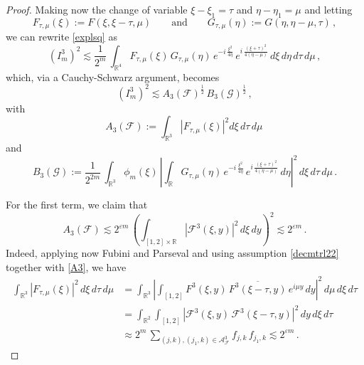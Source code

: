 \documentclass[a4paper,reqno]{amsart}
\numberwithin{equation}{section}
\theoremstyle{definition}
\newcommand{\R}{\mathbb{R}}
\def\F{\mathcal{F}}
\def\G{\mathcal{G}}
\def\v{\varepsilon}
\def\A{\mathcal{A}}
\begin{document}
\begin{proof}
Making now the change of variable $\xi-\xi_1=\tau$ and $\eta-\eta_1=\mu$ and letting
\begin{equation}\label{FG}
	F_{\tau,\mu}(\xi):=F(\xi,\xi-\tau,\mu)\qquad\textrm{and}\qquad G_{\tau,\mu}(\eta):=G(\eta,\eta-\mu,\tau)\,,
\end{equation}
we can rewrite \eqref{explsq} as
\begin{equation}\label{explsq1}
	(I_m^3)^2\lesssim
	\frac{1}{2^m}\,\int_{\R^4} F_{\tau,\mu}(\xi)\,G_{\tau,\mu}(\eta)\,
	e^{-i\,\frac{\xi^2}{4 \eta}}\,e^{i\,\frac{(\xi+\tau)^2}{4(\eta-\mu)}}\,d\xi\,d\eta\,d\tau\,d\mu\,,
\end{equation}
which, via a Cauchy-Schwarz argument, becomes
\begin{equation}\label{IM3}
	(I_m^3)^2\lesssim A_3(\F)^{\frac{1}{2}}\,B_3(\G)^{\frac{1}{2}}\,,
\end{equation}
with
\begin{equation}\label{reduct3a}
A_3(\F):=\int_{\R^3} \left| F_{\tau,\mu}(\xi)\right|^2 d\xi\,d\tau\,d\mu\,
\end{equation}
and
\begin{equation}\label{reduct3b}
B_3(\G):=\frac{1}{2^{2m}}\,\int_{\R^3}\phi_m(\xi)\,\left|\int_{\R} G_{\tau,\mu}(\eta)\,
	e^{-i\,\frac{\xi^2}{4 \eta}}\,e^{i\,\frac{(\xi+\tau)^2}{4(\eta-\mu)}}\,d\eta\right|^2\,d\xi\,d\tau\,d\mu\,.
\end{equation}


For the first term, we claim that
\begin{equation}\label{l2F}
A_3(\F)\lesssim 2^{\v m}\,\left(\int_{[1,2]\times\R} |\F^3(\xi,y)|^2\,d\xi\,dy\right)^{2}\lesssim 2^{\v m}\,.
\end{equation}
Indeed, applying now Fubini and Parseval and using assumption \eqref{decmtrl22} together with \eqref{A3}, we have
\begin{align}\label{l2cont}
	\int_{\R^3} |F_{\tau,\mu}(\xi)|^2\,d\xi\,d\tau\,d\mu&= \int_{\R^3}\left|\int_{[1,2]} F^3(\xi,y)\,\overline{F^3(\xi-\tau,y)}\,e^{i \mu y}\,dy\right|^2\,d\mu\,d\xi\,d\tau\nonumber\\
	&= \int_{\R^2}\int_{[1,2]} \left|\F^{3}(\xi,y)\,\F^3(\xi-\tau,y)\right|^2 \,dy\,d\xi\,d\tau\nonumber\\[1ex]
	&\approx 2^{m}\,\sum_{(j,k),(j_1,k)\in\A_{\F}^{3}} f_{j,k}\,f_{j_1,k}\lesssim 2^{\v m}\,.
\end{align}


\end{proof}
\end{document}
